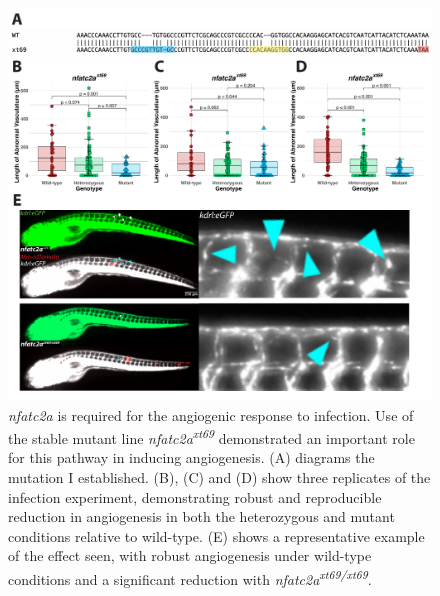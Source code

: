 \begin{figure}
\centering
\includegraphics[width=\textwidth]{images/nfatc2alarvae.pdf}
\caption[\textit{nfatc2a} is necessary for angiogenesis during infection]{\textit{nfatc2a} is required for the angiogenic response to infection. Use of the stable mutant line \textit{nfatc2a\textsuperscript{xt69}} demonstrated an important role for this pathway in inducing angiogenesis. (A) diagrams the mutation I established. (B), (C) and (D) show three replicates of the infection experiment, demonstrating robust and reproducible reduction in angiogenesis in both the heterozygous and mutant conditions relative to wild\hyp{}type. (E) shows a representative example of the effect seen, with robust angiogenesis under wild\hyp{}type conditions and a significant reduction with \textit{nfatc2a\textsuperscript{xt69/xt69}}.}
\label{figure:c2larvae}
\end{figure}

